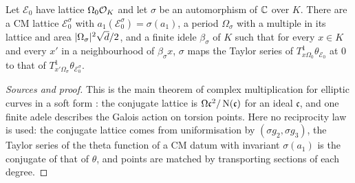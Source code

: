 \begin{theorem}\label{thm:B-cm-reciprocity}
Let $\mathcal E_0$ have lattice $\Omega_0\mathcal{O}_K$ and let $\sigma$ be an automorphism of $\mathbb{C}$ over $K$.
There are a CM lattice $\mathcal E_0^\sigma$ with $a_1(\mathcal E_0^\sigma)=\sigma(a_1)$, a period $\Omega_\sigma$
with a multiple in its lattice and area $\lvert \Omega_\sigma\rvert^2\sqrt d/2$, and a finite idele $\beta_\sigma$ of
$K$ such that for every $x\in K$ and every $x'$ in a neighbourhood of $\beta_\sigma x$, $\sigma$ maps the
Taylor series of $T^1_{x\Omega_0}\theta_{\mathcal E_0}$ at $0$ to that of $T^1_{x'\Omega_\sigma}
\theta_{\mathcal E_0^\sigma}$.
\end{theorem}

\begin{proof}[Sources and proof]
This is the main theorem of complex multiplication for elliptic curves in a soft form
\cite[Thm.~5.4]{Shimura1971}: the conjugate lattice is $\Omega\mathfrak c^2/\operatorname{N}(\mathfrak c)$ for an ideal
$\mathfrak c$, and one finite adele describes the Galois action on torsion points. Here no reciprocity law
is used: the conjugate lattice comes from uniformisation by $(\sigma g_2,\sigma g_3)$, the Taylor series of
the theta function of a CM datum with invariant $\sigma(a_1)$ is the conjugate of that of $\theta$, and points
are matched by transporting sections of each degree.
\end{proof}

